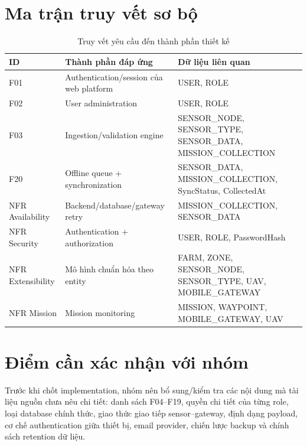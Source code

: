 \section{Ma trận truy vết sơ bộ}
\begin{longtable}{p{2cm}p{5cm}p{5cm}}
\caption{Truy vết yêu cầu đến thành phần thiết kế}\label{tab:trace}\\
\toprule
ID & Thành phần đáp ứng & Dữ liệu liên quan \\
\midrule
F01 & Authentication/session của web platform & USER, ROLE\\
F02 & User administration & USER, ROLE\\
F03 & Ingestion/validation engine & SENSOR\_NODE, SENSOR\_TYPE, SENSOR\_DATA, MISSION\_COLLECTION\\
F20 & Offline queue + synchronization & SENSOR\_DATA, MISSION\_COLLECTION, SyncStatus, CollectedAt\\
NFR Availability & Backend/database/gateway retry & MISSION\_COLLECTION, SENSOR\_DATA\\
NFR Security & Authentication + authorization & USER, ROLE, PasswordHash\\
NFR Extensibility & Mô hình chuẩn hóa theo entity & FARM, ZONE, SENSOR\_NODE, SENSOR\_TYPE, UAV, MOBILE\_GATEWAY\\
NFR Mission & Mission monitoring & MISSION, WAYPOINT, MOBILE\_GATEWAY, UAV\\
\bottomrule
\end{longtable}

\section{Điểm cần xác nhận với nhóm}
Trước khi chốt implementation, nhóm nên bổ sung/kiểm tra các nội dung mà tài liệu nguồn chưa nêu chi tiết: danh sách F04--F19, quyền chi tiết của từng role, loại database chính thức, giao thức giao tiếp sensor--gateway, định dạng payload, cơ chế authentication giữa thiết bị, email provider, chiến lược backup và chính sách retention dữ liệu.
